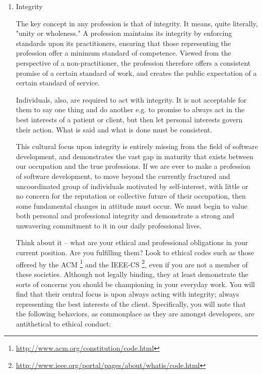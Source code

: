 \documentclass{article}
\begin{document}
\begin{enumerate}
\item Integrity
\label{sec:orgheadline406}

The key concept in any profession is that of integrity. It means, quite
literally, "unity or wholeness." A profession maintains its integrity by
enforcing standards upon its practitioners, ensuring that those
representing the profession offer a minimum standard of competence.
Viewed from the perspective of a non-practitioner, the profession
therefore offers a consistent promise of a certain standard of work, and
creates the public expectation of a certain standard of service.

Individuals, also, are required to act with integrity. It is not
acceptable for them to say one thing and do another e.g. to promise to
always act in the best interests of a patient or client, but then let
personal interests govern their action. What is said and what is done
must be consistent.

This cultural focus upon integrity is entirely missing from the field of
software development, and demonstrates the vast gap in maturity that
exists between our occupation and the true professions. If we are ever
to make a profession of software development, to move beyond the
currently fractured and uncoordinated group of individuals motivated by
self-interest, with little or no concern for the reputation or
collective future of their occupation, then some fundamental changes in
attitude must occur. We must begin to value both personal and
professional integrity and demonstrate a strong and unwavering
commitment to it in our daily professional lives.

Think about it -- what are your ethical and professional obligations in
your current position. Are you fulfilling them? Look to ethical codes
such as those offered by the ACM \footnote{\url{http://www.acm.org/constitution/code.html}} and the IEEE-CS \footnote{\url{http://www.ieee.org/portal/pages/about/whatis/code.html}}, even if
you are not a member of these societies. Although not legally binding,
they at least demonstrate the sorts of concerns you should be
championing in your everyday work. You will find that their central
focus is upon always acting with integrity; always representing the best
interests of the client. Specifically, you will note that the following
behaviors, as commonplace as they are amongst developers, are
antithetical to ethical conduct:


\end{enumerate}
\end{document}
